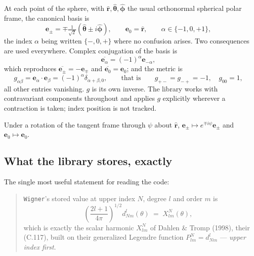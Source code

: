 \documentclass[11pt,a4paper]{article}
\newcommand{\ebasis}[1]{\mathbf{e}_{#1}}
\newcommand{\conj}[1]{\overline{#1}}
\newcommand{\code}[1]{\texttt{#1}}
\begin{document}
At each point of the sphere, with $\hat{\mathbf{r}},
\hat{\boldsymbol{\theta}}, \hat{\boldsymbol{\phi}}$ the usual orthonormal
spherical polar frame, the canonical basis is
\begin{equation}
  \ebasis{\pm} = \mp \tfrac{1}{\sqrt{2}}
    \left( \hat{\boldsymbol{\theta}} \pm i \hat{\boldsymbol{\phi}} \right),
  \qquad
  \ebasis{0} = \hat{\mathbf{r}},
  \qquad \alpha \in \{-1,0,+1\},
  \label{eq:basis}
\end{equation}
the index $\alpha$ being written $\{-,0,+\}$ where no confusion arises.
Two consequences are used everywhere.  Complex conjugation of the basis is
\begin{equation}
  \conj{\ebasis{\alpha}} = (-1)^{\alpha} \ebasis{-\alpha},
  \label{eq:basisconj}
\end{equation}
which reproduces $\conj{\ebasis{\pm}} = -\ebasis{\mp}$ and
$\conj{\ebasis{0}} = \ebasis{0}$; and the metric is
\begin{equation}
  g_{\alpha\beta} = \ebasis{\alpha}\cdot\ebasis{\beta}
                  = (-1)^{\alpha}\delta_{\alpha+\beta,0},
  \qquad\text{that is}\qquad
  g_{+-}=g_{-+}=-1, \quad g_{00}=1,
  \label{eq:metric}
\end{equation}
all other entries vanishing.  $g$ is its own inverse.  The library works
with contravariant components throughout and applies $g$ explicitly
wherever a contraction is taken; index position is not tracked.

Under a rotation of the tangent frame through $\psi$ about
$\hat{\mathbf{r}}$, $\ebasis{\pm}\mapsto e^{\mp i\psi}\ebasis{\pm}$ and
$\ebasis{0}\mapsto\ebasis{0}$.

\subsection{What the library stores, exactly}

The single most useful statement for reading the code:

\begin{quote}
  \code{Wigner}'s stored value at upper index $N$, degree $l$ and order
  $m$ is
  \begin{equation}
    \left(\frac{2l+1}{4\pi}\right)^{1/2} d^{l}_{Nm}(\theta)
      \;=\; X^{N}_{lm}(\theta),
    \label{eq:stored}
  \end{equation}
  which is exactly the scalar harmonic $X^N_{lm}$ of Dahlen \& Tromp
  (1998), their (C.117), built on their generalized Legendre function
  $P^N_{lm} = d^l_{Nm}$ --- \emph{upper index first}.
\end{quote}
\end{document}
